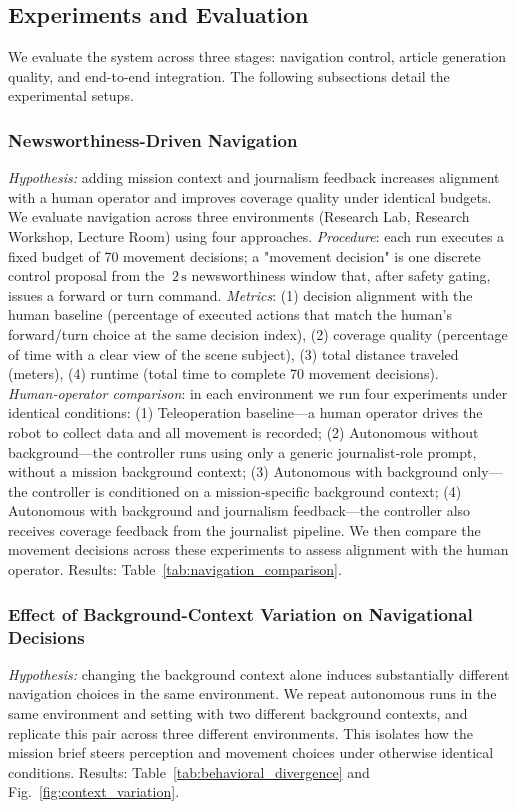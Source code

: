 \documentclass[letterpaper, 10 pt, conference]{ieeeconf}  %
\begin{document}
\subsection{Experiments and Evaluation}
We evaluate the system across three stages: navigation control, article generation quality, and end-to-end integration. The following subsections detail the experimental setups.

\subsubsection{Newsworthiness-Driven Navigation}
\textit{Hypothesis:} adding mission context and journalism feedback increases alignment with a human operator and improves coverage quality under identical budgets.
We evaluate navigation across three environments (Research Lab, Research Workshop, Lecture Room) using four approaches. \emph{Procedure}: each run executes a fixed budget of 70 movement decisions; a "movement decision" is one discrete control proposal from the \(~2\,\text{s}\) newsworthi\-ness window that, after safety gating, issues a forward or turn command. \emph{Metrics}: (1) decision alignment with the human baseline (percentage of executed actions that match the human's forward/turn choice at the same decision index), (2) coverage quality (percentage of time with a clear view of the scene subject), (3) total distance traveled (meters), (4) runtime (total time to complete 70 movement decisions). \emph{Human‑operator comparison}: in each environment we run four experiments under identical conditions: (1) Teleoperation baseline—a human operator drives the robot to collect data and all movement is recorded; (2) Autonomous without background—the controller runs using only a generic journalist‑role prompt, without a mission background context; (3) Autonomous with background only—the controller is conditioned on a mission‑specific background context; (4) Autonomous with background and journalism feedback—the controller also receives coverage feedback from the journalist pipeline. We then compare the movement decisions across these experiments to assess alignment with the human operator. Results: Table~\ref{tab:navigation_comparison}.

\subsubsection{Effect of Background-Context Variation on Navigational Decisions}
\textit{Hypothesis:} changing the background context alone induces substantially different navigation choices in the same environment.
We repeat au\-ton\-omous runs in the same environment and setting with two different background contexts, and replicate this pair across three different environments. This isolates how the mission brief steers perception and movement choices under otherwise identical conditions. Results: Table~\ref{tab:behavioral_divergence} and Fig.~\ref{fig:context_variation}.
\end{document}

